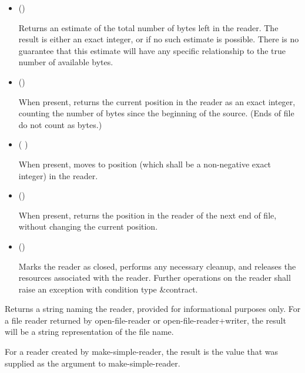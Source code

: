 \begin{entry}{%
}
\begin{itemize}
   may or may not be a bytes object returned by {\cf
    make-i/o-buffer}.
  
   may or may not be the same as the chunk size of the
  reader.

\item {\cf ()}
       
  Returns an estimate of the total number of bytes left in the
  reader. The result is either an exact integer, or
  \schfalse{} if no such estimate is possible. There is no guarantee
  that this estimate will have any specific relationship to the true
  number of available bytes.

\item {\cf ()}
       
  When present, 
  returns the current position in the 
  reader as an exact integer, counting the number of bytes since the
  beginning of the source. (Ends of file do not count as bytes.)
  
\item {\cf ( )}
       
  When present,  moves to position  (which
  shall be a non-negative exact integer) in the reader.
       
\item {\cf ()}
       
  When present,  returns the position in the reader
  of the next end of file, without changing the current position.

\item {\cf ()}
       
  Marks the reader as closed, performs any necessary
  cleanup, and releases the resources associated with the reader.
  Further operations on the reader shall raise an exception with
  condition type {\cf\&contract}.
\end{itemize}

\end{entry}

\begin{entry}{%
}
   
Returns a string naming the reader, provided for informational
purposes only. For a file reader returned by {\cf open-file-reader} or
{\cf open-file-reader+writer}, the result will be a string representation of the file
name.
  
For a reader created by {\cf make-simple-reader}, the result is the value that was
supplied as the  argument to {\cf make-simple-reader}.
\end{entry}

